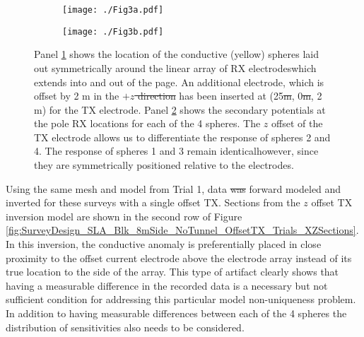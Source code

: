 \documentclass[preprint,authoryear,12pt]{elsarticle}
\providecommand{\DIFaddtex}[1]{{\protect\color{blue}\uwave{#1}}} %
\providecommand{\DIFdeltex}[1]{{\protect\color{red}\sout{#1}}}                      %
\providecommand{\DIFaddbegin}{} %
\providecommand{\DIFaddend}{} %
\providecommand{\DIFdelbegin}{} %
\providecommand{\DIFdelend}{} %
\providecommand{\DIFaddFL}[1]{\DIFadd{#1}} %
\providecommand{\DIFdelFL}[1]{\DIFdel{#1}} %
\providecommand{\DIFaddbeginFL}{} %
\providecommand{\DIFaddendFL}{} %
\providecommand{\DIFdelbeginFL}{} %
\providecommand{\DIFdelendFL}{} %
\providecommand{\DIFadd}[1]{\texorpdfstring{\DIFaddtex{#1}}{#1}} %
\providecommand{\DIFdel}[1]{\texorpdfstring{\DIFdeltex{#1}}{}} %
\begin{document}
\begin{figure}[htp]
   \begin{center}
      \begin{subfigure}{0.4\linewidth}
         \DIFdelbeginFL %
\DIFdelendFL \DIFaddbeginFL \texttt{[image: ./Fig3a.pdf]}
         \DIFaddendFL \caption{}
         \label{fig:4Spheres_ZOffset_Model}
      \end{subfigure}
      \hfill
      \begin{subfigure}{0.59\linewidth}
         \DIFdelbeginFL %
\DIFdelendFL \DIFaddbeginFL \texttt{[image: ./Fig3b.pdf]}
         \DIFaddendFL \caption{}
         \label{fig:4Spheres_ZOffset_Vs}
      \end{subfigure}
   \end{center}
\caption{Panel \ref{fig:4Spheres_ZOffset_Model} shows the location of the conductive (yellow) spheres laid out symmetrically around the linear array of RX electrodes\DIFaddbeginFL \DIFaddFL{, }\DIFaddendFL which extends into and out of the page. An additional electrode, which is offset by 2 m in the \DIFdelbeginFL \DIFdelFL{$+z$  direction }\DIFdelendFL \DIFaddbeginFL \DIFaddFL{positive $z$-direction, }\DIFaddendFL has been inserted at (25\DIFdelbeginFL \DIFdelFL{m}\DIFdelendFL , 0\DIFdelbeginFL \DIFdelFL{m}\DIFdelendFL , 2 m) for the TX electrode. Panel \ref{fig:4Spheres_ZOffset_Vs} shows the secondary potentials at the pole RX locations for each of the 4 spheres. The $z$ offset of the TX electrode allows us to differentiate the response of spheres 2 and 4. The response of spheres 1 and 3 remain identical\DIFaddbeginFL \DIFaddFL{, }\DIFaddendFL however, since they are symmetrically positioned relative to the electrodes.}
\label{fig:4Spheres_TX_ZOffset}
\end{figure}

Using the same mesh and model from Trial 1, data \DIFdelbegin \DIFdel{was }\DIFdelend \DIFaddbegin \DIFadd{were }\DIFaddend forward modeled and inverted for these surveys with a single offset TX. Sections from the $z$ offset TX inversion model are shown in the second row of Figure \ref{fig:SurveyDesign_SLA_Blk_8mSide_NoTunnel_OffsetTX_Trials_XZSections}. In this inversion, the conductive anomaly is preferentially placed in close proximity to the offset current electrode above the electrode array instead of its true location to the side of the array. This type of artifact clearly shows that having a measurable difference in the recorded data is a necessary but not sufficient condition for addressing this particular model non-uniqueness problem. In addition to having measurable differences between each of the 4 spheres the distribution of sensitivities also needs to be considered.
\end{document}
